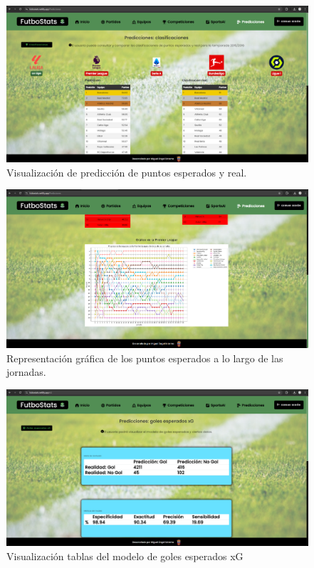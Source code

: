\begin{figure}[H]
    \centering
    \includegraphics[width=1\linewidth]{img/predicciones1-UM.png}
    \caption{Visualización de predicción de puntos esperados y real.}
    \label{fig:enter-label}
\end{figure}

\begin{figure}[H]
    \centering
    \includegraphics[width=1\linewidth]{img/predicciones2-UM.png}
    \caption{Representación gráfica de los puntos esperados a lo largo de las jornadas.}
    \label{fig:enter-label}
\end{figure}

\begin{figure}[H]
    \centering
    \includegraphics[width=1\linewidth]{img/golesEsperados1-UM.png}
    \caption{Visualización tablas del modelo de goles esperados xG}
    \label{fig:enter-label}
\end{figure}

